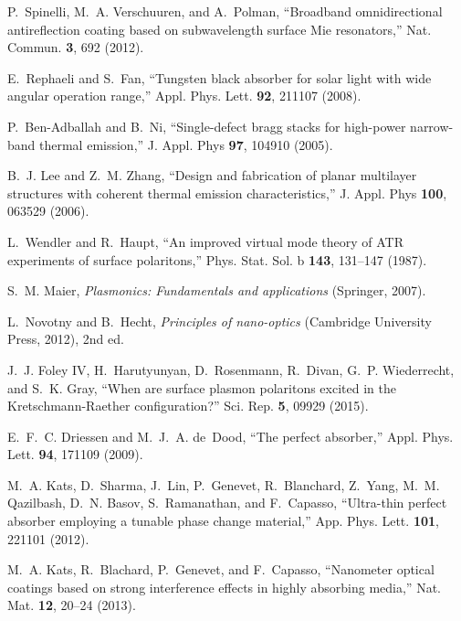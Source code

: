 \documentclass[10pt,letterpaper]{article}
\begin{document}
\begin{thebibliography}{100}
P.~Spinelli, M.~A. Verschuuren, and A.~Polman, \enquote{Broadband
  omnidirectional antireflection coating based on subwavelength surface {M}ie
  resonators,} Nat. Commun. \textbf{3}, 692 (2012).

E.~Rephaeli and S.~Fan, \enquote{Tungsten black absorber for solar light with
  wide angular operation range,} Appl. Phys. Lett. \textbf{92}, 211107 (2008).

P.~Ben-Adballah and B.~Ni, \enquote{Single-defect bragg stacks for high-power
  narrow-band thermal emission,} J. Appl. Phys \textbf{97}, 104910 (2005).

B.~J. Lee and Z.~M. Zhang, \enquote{Design and fabrication of planar multilayer
  structures with coherent thermal emission characteristics,} J. Appl. Phys
  \textbf{100}, 063529 (2006).

L.~Wendler and R.~Haupt, \enquote{An improved virtual mode theory of {ATR}
  experiments of surface polaritons,} Phys. Stat. Sol. b \textbf{143}, 131--147
  (1987).

S.~M. Maier, \emph{Plasmonics: Fundamentals and applications} (Springer, 2007).

L.~Novotny and B.~Hecht, \emph{Principles of nano-optics} (Cambridge University
  Press, 2012), 2nd ed.

J.~J. {Foley IV}, H.~Harutyunyan, D.~Rosenmann, R.~Divan, G.~P. Wiederrecht,
  and S.~K. Gray, \enquote{When are surface plasmon polaritons excited in the
  {K}retschmann-{R}aether configuration?} Sci. Rep. \textbf{5}, 09929 (2015).

                                                                                 
E.~F.~C. Driessen and M.~J.~A. de~Dood, \enquote{The perfect absorber,} Appl.
  Phys. Lett. \textbf{94}, 171109 (2009).

M.~A. Kats, D.~Sharma, J.~Lin, P.~Genevet, R.~Blanchard, Z.~Yang, M.~M.
  Qazilbash, D.~N. Basov, S.~Ramanathan, and F.~Capasso, \enquote{Ultra-thin
  perfect absorber employing a tunable phase change material,} App. Phys. Lett.
  \textbf{101}, 221101 (2012).

M.~A. Kats, R.~Blachard, P.~Genevet, and F.~Capasso, \enquote{Nanometer optical
  coatings based on strong interference effects in highly absorbing media,}
  Nat. Mat. \textbf{12}, 20--24 (2013).


\end{thebibliography}
\end{document}
